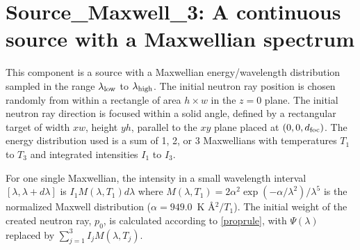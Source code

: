 \section{Source\_Maxwell\_3: A continuous source
with a Maxwellian spectrum}
\label{source-maxwell}


This component is a source with a Maxwellian energy/wavelength distribution
sampled in the range $\lambda_{\rm low}$ to $\lambda_{\rm high}$.
The initial neutron ray position is chosen randomly from within a
rectangle of area $h \times w$ in the $z=0$ plane.
The initial neutron ray direction is focused within
a solid angle, defined by a rectangular target of width
$xw$, height $yh$, parallel to
the $xy$ plane placed at $(0,0,d_{\rm foc})$.
The energy distribution used is a sum of 1, 2, or 3 Maxwellians with
temperatures $T_1$ to $T_3$ and integrated intensities $I_1$ to $I_3$.

For one single Maxwellian,
the intensity in a small wavelength interval $[\lambda, \lambda+d\lambda]$ is
$ I_1 M(\lambda,T_1) d\lambda $
where
$M(\lambda,T_1) = 2 \alpha^2 \exp(-\alpha/\lambda^2) / \lambda^5 $
is the normalized Maxwell distribution ($\alpha=949.0$~K \AA$^2/T_1$).
The initial weight of the created neutron ray, $p_0$, is
calculated according to \ref{proprule}, with $\Psi(\lambda)$ replaced
by $\sum_{j=1}^3 I_j M(\lambda,T_j)$.

%
%

